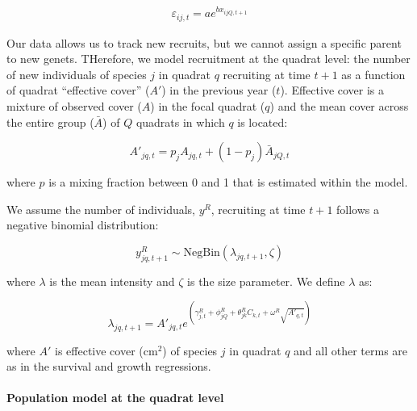 \documentclass[12pt,]{article}
\begin{document}
\begin{align}
\varepsilon_{ij,t} = a e^{b x_{ijQ,t+1}}
\end{align}

Our data allows us to track new recruits, but we cannot assign a
specific parent to new genets. THerefore, we model recruitment at the
quadrat level: the number of new individuals of species \(j\) in quadrat
\(q\) recruiting at time \(t+1\) as a function of quadrat ``effective
cover'' (\(A'\)) in the previous year (\(t\)). Effective cover is a
mixture of observed cover (\(A\)) in the focal quadrat (\(q\)) and the
mean cover across the entire group (\(\bar{A}\)) of \(Q\) quadrats in
which \(q\) is located:

\begin{equation}
A'_{jq,t} = p_{j}A_{jq,t} + (1-p_{j})\bar{A}_{jQ,t}
\end{equation}

where \(p\) is a mixing fraction between 0 and 1 that is estimated
within the model.

We assume the number of individuals, \(y^{R}\), recruiting at time
\(t+1\) follows a negative binomial distribution:

\begin{equation}
y^{R}_{jq,t+1} \sim \text{NegBin}(\lambda_{jq,t+1},\zeta)
\end{equation}

where \(\lambda\) is the mean intensity and \(\zeta\) is the size
parameter. We define \(\lambda\) as:

\begin{equation}
\lambda_{jq,t+1} = A'_{jq,t}e^{(\gamma^{R}_{j,t} + \phi^{R}_{jQ} + \theta^{R}_{jk}C_{k,t} + \omega^{R}\sqrt{A'_{q,t}})}
\end{equation}

where \(A'\) is effective cover (\(\text{cm}^2\)) of species \(j\) in
quadrat \(q\) and all other terms are as in the survival and growth
regressions.

\paragraph{Population model at the quadrat
level}\label{population-model-at-the-quadrat-level}
\end{document}
